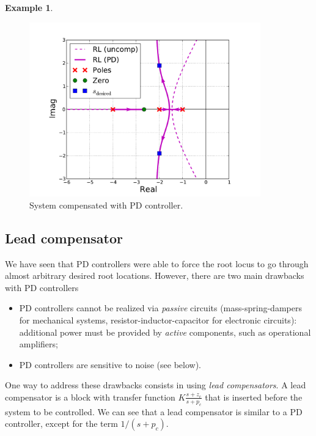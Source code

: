 \documentclass[a4paper,11pt]{report}
\theoremstyle{definition}
\newtheorem{mdexample}{Example}
\newenvironment{example}%
  {\vspace{0.1cm}\begin{mdframed}[backgroundcolor=lightgray]\begin{mdexample}}%
  {\end{mdexample}\end{mdframed}\vspace{0.1cm}}
\begin{document}
\begin{example}
  \begin{figure}[H]
    \centering
    \includegraphics[width=10cm]{fig/design-PD.pdf}
    \caption{System compensated with PD controller.}
    \label{fig:design-PD}
  \end{figure}


\end{example}

\subsection{Lead compensator}
\label{sec:lead}

We have seen that PD controllers were able to force the root locus to
go through almost arbitrary desired root locations. However, there are
two main drawbacks with PD controllers
\begin{itemize}
\item PD controllers cannot be realized via \emph{passive} circuits
  (mass-spring-dampers for mechanical systems,
  resistor-inductor-capacitor for electronic circuits): additional
  power must be provided by \emph{active} components, such as
  operational amplifiers;
\item PD controllers are sensitive to noise (see below).
\end{itemize}

One way to address these drawbacks consists in using \emph{lead
  compensators}. A lead compensator is a block with transfer function
$K\frac{s+z_c}{s+p_c}$ that is inserted before the system to be
controlled. We can see that a lead compensator is similar to a PD
controller, except for the term $1/(s+p_c)$.
\end{document}
